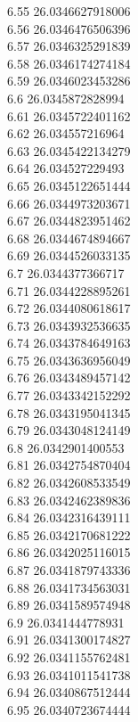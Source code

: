 {6.55	26.0346627918006\\
6.56	26.0346476506396\\
6.57	26.0346325291839\\
6.58	26.0346174274184\\
6.59	26.0346023453286\\
6.6	26.0345872828994\\
6.61	26.0345722401162\\
6.62	26.034557216964\\
6.63	26.0345422134279\\
6.64	26.034527229493\\
6.65	26.0345122651444\\
6.66	26.0344973203671\\
6.67	26.0344823951462\\
6.68	26.0344674894667\\
6.69	26.0344526033135\\
6.7	26.0344377366717\\
6.71	26.0344228895261\\
6.72	26.0344080618617\\
6.73	26.0343932536635\\
6.74	26.0343784649163\\
6.75	26.0343636956049\\
6.76	26.0343489457142\\
6.77	26.0343342152292\\
6.78	26.0343195041345\\
6.79	26.0343048124149\\
6.8	26.0342901400553\\
6.81	26.0342754870404\\
6.82	26.0342608533549\\
6.83	26.0342462389836\\
6.84	26.0342316439111\\
6.85	26.0342170681222\\
6.86	26.0342025116015\\
6.87	26.0341879743336\\
6.88	26.0341734563031\\
6.89	26.0341589574948\\
6.9	26.0341444778931\\
6.91	26.0341300174827\\
6.92	26.0341155762481\\
6.93	26.0341011541738\\
6.94	26.0340867512444\\
6.95	26.0340723674444\\
}
